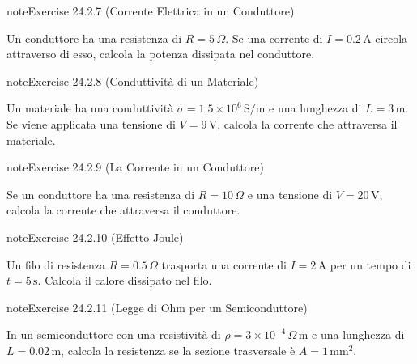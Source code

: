 \documentclass[letterpaper,10pt,italian]{jupyterBook}
\begin{document}
\begin{sphinxadmonition}{note}{Exercise 24.2.7 (Corrente Elettrica in un Conduttore)}



\sphinxAtStartPar
Un conduttore ha una resistenza di \(R = 5 \, \Omega\). Se una corrente di \(I = 0.2 \, \text{A}\) circola attraverso di esso, calcola la potenza dissipata nel conduttore.
\end{sphinxadmonition}
 \label{exercise:ch/electromagnetism/electric-current-problems-exercise-7}

\begin{sphinxadmonition}{note}{Exercise 24.2.8 (Conduttività di un Materiale)}



\sphinxAtStartPar
Un materiale ha una conduttività \(\sigma = 1.5 \times 10^6 \, \text{S/m}\) e una lunghezza di \(L = 3 \, \text{m}\). Se viene applicata una tensione di \(V = 9 \, \text{V}\), calcola la corrente che attraversa il materiale.
\end{sphinxadmonition}
 \label{exercise:ch/electromagnetism/electric-current-problems-exercise-8}

\begin{sphinxadmonition}{note}{Exercise 24.2.9 (La Corrente in un Conduttore)}



\sphinxAtStartPar
Se un conduttore ha una resistenza di \(R = 10 \, \Omega\) e una tensione di \(V = 20 \, \text{V}\), calcola la corrente che attraversa il conduttore.
\end{sphinxadmonition}
 \label{exercise:ch/electromagnetism/electric-current-problems-exercise-9}

\begin{sphinxadmonition}{note}{Exercise 24.2.10 (Effetto Joule)}



\sphinxAtStartPar
Un filo di resistenza \(R = 0.5 \, \Omega\) trasporta una corrente di \(I = 2 \, \text{A}\) per un tempo di \(t = 5 \, \text{s}\). Calcola il calore dissipato nel filo.
\end{sphinxadmonition}
 \label{exercise:ch/electromagnetism/electric-current-problems-exercise-10}

\begin{sphinxadmonition}{note}{Exercise 24.2.11 (Legge di Ohm per un Semiconduttore)}



\sphinxAtStartPar
In un semiconduttore con una resistività di \(\rho = 3 \times 10^{-4} \, \Omega \, \text{m}\) e una lunghezza di \(L = 0.02 \, \text{m}\), calcola la resistenza se la sezione trasversale è \(A = 1 \, \text{mm}^2\).
\end{sphinxadmonition}
 \label{exercise:ch/electromagnetism/electric-current-problems-exercise-11}
\end{document}
